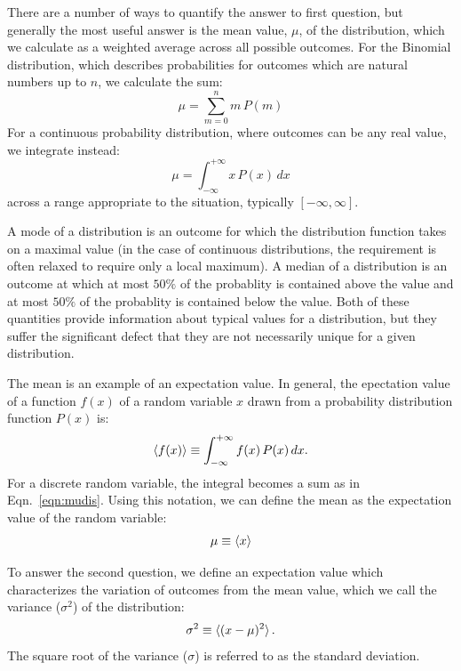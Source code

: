 \documentclass[12pt,oneside]{book}
\begin{document}
There are a number of ways to quantify the answer to first question,
but generally the most useful answer is the mean value, $\mu$, of the
distribution, which we calculate as a weighted average across all
possible outcomes.  For the Binomial distribution, which describes
probabilities for outcomes which are natural numbers up to $n$, we
calculate the sum:
\begin{equation}
\label{eqn:mudis}
\mu = \sum_{m=0}^{n} m \, P(m)
\end{equation}
For a continuous probability distribution, where outcomes can be any
real value, we integrate instead:
\begin{equation}
\mu = \int_{-\infty}^{+\infty} x \, P(x) \, dx 
\end{equation}
across a range appropriate to the situation, typically $[-\infty,\infty]$.

A mode of a distribution is an outcome for which the distribution
function takes on a maximal value (in the case of continuous
distributions, the requirement is often relaxed to require only a
local maximum).  A median of a distribution is an outcome at which at
most $50\%$ of the probablity is contained above the value and at most
$50\%$ of the probablity is contained below the value.  Both of these
quantities provide information about typical values for a
distribution, but they suffer the significant defect that they are not
necessarily unique for a given distribution.

The mean is an example of an expectation value.  In general, the
epectation value of a function $f(x)$ of a random variable $x$ drawn
from a probability distribution function $P(x)$ is:
\begin{displaymath}
\braket{f(x)} \equiv \int_{-\infty}^{+\infty} f(x) \, P(x) \,dx.
\end{displaymath}
For a discrete random variable, the integral becomes a sum as in
Eqn.~\ref{eqn:mudis}.  Using this notation, we can define the mean as the
expectation value of the random variable:
\begin{displaymath}
\mu \equiv \braket{x}
\end{displaymath}

To answer the second question, we define an expectation value
which characterizes the variation of outcomes from the mean value,
which we call the variance ($\sigma^2$) of the distribution:
\begin{displaymath}
\sigma^2 \equiv \braket{(x-\mu)^2}.
\end{displaymath}
The square root of the variance ($\sigma$) is referred to as the
standard deviation.
\end{document}
